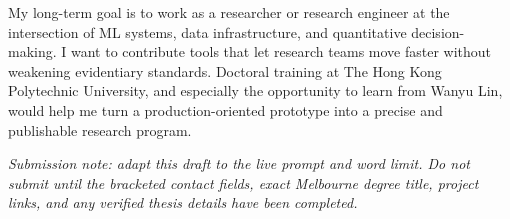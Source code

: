 \documentclass[11pt]{article}
\begin{document}
My long-term goal is to work as a researcher or research engineer at the intersection of ML systems, data infrastructure, and quantitative decision-making. I want to contribute tools that let research teams move faster without weakening evidentiary standards. Doctoral training at The Hong Kong Polytechnic University, and especially the opportunity to learn from Wanyu Lin, would help me turn a production-oriented prototype into a precise and publishable research program.

\textit{Submission note: adapt this draft to the live prompt and word limit. Do not submit until the bracketed contact fields, exact Melbourne degree title, project links, and any verified thesis details have been completed.}
\end{document}
